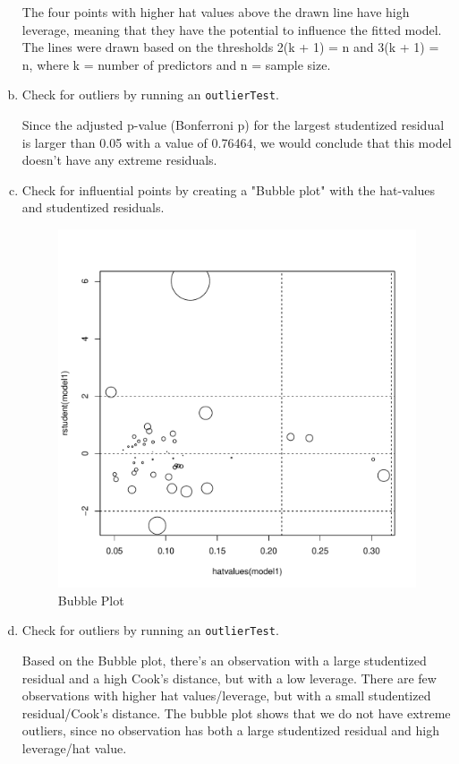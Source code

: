 \documentclass[12pt,letterpaper]{article}
\begin{document}
\begin{enumerate}[(a)]
The four points with higher hat values above the drawn line have high leverage, meaning that they have the potential to influence the fitted model. The lines were drawn based on the thresholds 2(k + 1) = n and 3(k + 1) = n, where k = number of predictors and n = sample size.

	\item Check for outliers by running an \texttt{outlierTest}.
			 	 
			 	
	Since the adjusted p-value (Bonferroni p) for the largest studentized residual is larger than 0.05 with a value of 0.76464, we would conclude that this model doesn't have any extreme residuals.
	
	\newpage
	\item Check for influential points by creating a "Bubble plot" with the hat-values and studentized residuals.
	
		\begin{figure} [h]
		\centering
		\includegraphics[width=0.7\linewidth]{plot4.pdf}
		\caption{Bubble Plot}
		\label{fig:graph2}
	\end{figure}

\item Check for outliers by running an \texttt{outlierTest}.
 

Based on the Bubble plot, there's an observation with a large studentized residual and a high Cook's distance, but with a low leverage. There are few observations with higher hat values/leverage, but with a small studentized residual/Cook's distance. The bubble plot shows that we do not have extreme outliers, since no observation has both a large studentized residual and high leverage/hat value. 
\end{enumerate}
\end{document}
